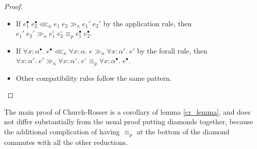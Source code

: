 \begin{proof}
\begin{itemize}
\begin{itemize}
\item If $e_1^\bullet\;e_2^\bullet\lll_\kappa e_1\;e_2\gg_\kappa e_1'\;e_2'$ by the application rule, then $e_1'\;e_2'\gg_\kappa e_1^\circ\;e_2^\circ\equiv_p e_1^\bullet\;e_2^\bullet$.
\item If $\forall x:\alpha^\bullet.\;e^\bullet\lll_\kappa \forall x:\alpha.\;e\gg_\kappa \forall x:\alpha'.\;e'$ by the forall rule, then $\forall x:\alpha'.\;e'\gg_\kappa \forall x:\alpha^\circ.\;e^\circ\equiv_p \forall x:\alpha^\bullet.\;e^\bullet$.
\item Other compatibility rules follow the same pattern.
\end{itemize}
\end{itemize}
\end{proof}
The main proof of Church-Rosser is a corollary of lemma \ref{cr_lemma}, and does not differ substantially from the usual proof putting diamonds together, because the additional complication of having $\equiv_p$ at the bottom of the diamond commutes with all the other reductions.
